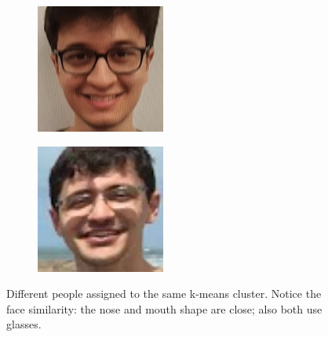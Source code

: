 \documentclass[conference]{IEEEtran}
\begin{document}
\begin{figure}
  \centering
  \begin{subfigure}[b]{0.2\textwidth}
    \includegraphics[width=\linewidth]{wrong_similar_a}
  \end{subfigure}
  \begin{subfigure}[b]{0.2\textwidth}
    \includegraphics[width=\linewidth]{wrong_similar_b}
  \end{subfigure}
  \caption{Different people assigned to the same k-means cluster. Notice the face similarity: the nose and mouth shape are close; also both use glasses.}
  \label{wrong_similar}
\end{figure}
\end{document}
